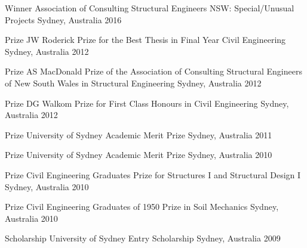 
\begin{cvhonors}

  \cvhonor
    {Winner} %
    {Association of Consulting Structural Engineers NSW: Special/Unusual Projects} %
    {Sydney, Australia} %
    {2016} %

  \cvhonor
    {Prize} %
    {JW Roderick Prize for the Best Thesis in Final Year Civil Engineering} %
    {Sydney, Australia} %
    {2012} %

  \cvhonor
    {Prize} %
    {AS MacDonald Prize of the Association of Consulting Structural Engineers of New South Wales in Structural Engineering} %
    {Sydney, Australia} %
    {2012} %

  \cvhonor
    {Prize} %
    {DG Walkom Prize for First Class Honours in Civil Engineering} %
    {Sydney, Australia} %
    {2012} %

  \cvhonor
    {Prize} %
    {University of Sydney Academic Merit Prize} %
    {Sydney, Australia} %
    {2011} %

  \cvhonor
    {Prize} %
    {University of Sydney Academic Merit Prize} %
    {Sydney, Australia} %
    {2010} %

  \cvhonor
    {Prize} %
    {Civil Engineering Graduates Prize for Structures I and Structural Design I} %
    {Sydney, Australia} %
    {2010} %

  \cvhonor
    {Prize} %
    {Civil Engineering Graduates of 1950 Prize in Soil Mechanics} %
    {Sydney, Australia} %
    {2010} %

  \cvhonor
    {Scholarship} %
    {University of Sydney Entry Scholarship} %
    {Sydney, Australia} %
    {2009} %

\end{cvhonors}
